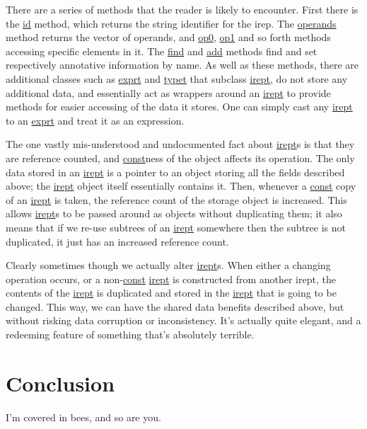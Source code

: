 \documentclass{article}
\begin{document}
There are a series of methods that the reader is likely to encounter. First
there is the \url{id} method, which returns the string identifier for the
irep. The \url{operands} method returns the vector of operands, and \url{op0},
\url{op1} and so forth methods accessing specific elements in it. The
\url{find} and \url{add} methods find and set respectively annotative
information by name. As well as these methods, there are additional classes
such as \url{exprt} and \url{typet} that subclass \url{irept}, do not store any
additional data, and essentially act as wrappers around an \url{irept} to
provide methods for easier accessing of the data it stores. One can simply
cast any \url{irept} to an \url{exprt} and treat it as an expression.

The one vastly mis-understood and undocumented fact about \url{irept}s is that
they are reference counted, and \url{const}ness of the object affects its
operation. The only data stored in an \url{irept} is a pointer to an object
storing all the fields described above; the \url{irept} object itself
essentially contains it. Then, whenever a \url{const} copy of an \url{irept}
is taken, the reference count of the storage object is increased. This allows
\url{irept}s to be passed around as objects without duplicating them; it also
means that if we re-use subtrees of an \url{irept} somewhere then the subtree
is not duplicated, it just has an increased reference count.

Clearly sometimes though we actually alter \url{irept}s. When either a
changing operation occurs, or a non-\url{const} \url{irept} is constructed from
another irept, the contents of the \url{irept} is duplicated and stored in
the \url{irept} that is going to be changed. This way, we can have the shared
data benefits described above, but without risking data corruption or
inconsistency. It's actually quite elegant, and a redeeming feature of something
that's absolutely terrible.

\section{Conclusion}

I'm covered in bees, and so are you.
\end{document}
